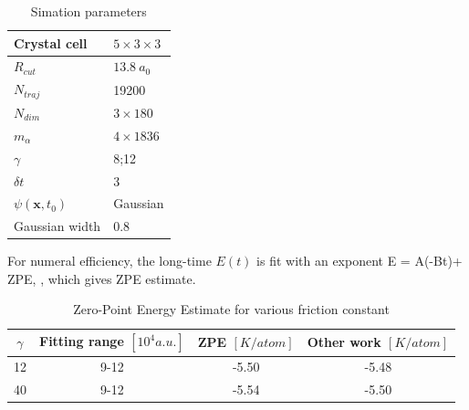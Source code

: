 \documentclass[11pt,letter,nocenter]{revtex4-1}
\begin{document}
\begin{table}
  \center

 \begin{tabular}{ | l | p{} | }
   \hline
   Crystal cell     & $5\times 3\times 3$ \\ \hline
   $R_{cut}$      &  $13.8 ~a_0$ \\ \hline  
   $N_{traj}$     &   19200 \\ \hline
   $N_{dim}$        & $3\times 180$  \\ \hline
   $m_\alpha$         & $4\times1836$ \\ \hline
   $ \gamma$          &  8;12  \\ \hline
   $\delta t$     &  3 \\ \hline
   $\psi(\bm x, t_0)$ &  Gaussian \\ \hline
   Gaussian width & 0.8 \\ \hline
 \end{tabular}
   \caption{Simation parameters}
\end{table}

For numeral efficiency, the long-time $E(t)$ is fit with an exponent
\be E = A\exp(-Bt)+ ZPE, \nonumber \ee,
which gives ZPE estimate.
\begin{table}
\center
\begin{tabular}{|c|c|c|c|}
\hline
 $\gamma$ & Fitting range $[10^4 a.u.]$ & ZPE $[K/atom]$ & Other work $[K/atom]$ \\ \hline
12 & 9-12  & -5.50 & -5.48 \cite{Hinde2011} \\  \hline
40 & 9-12 & -5.54 & -5.50 \cite{Cazorla2008} \\ \hline
\end{tabular}
\caption{Zero-Point Energy Estimate for various friction constant}
\end{table}




\end{document}
